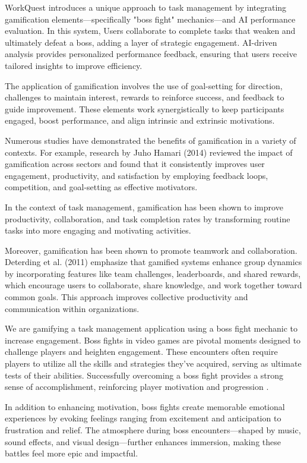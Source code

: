     WorkQuest introduces a unique approach to task management by integrating gamification elements—specifically "boss fight" mechanics—and AI performance evaluation. In this system, Users collaborate to complete tasks that weaken and ultimately defeat a boss, adding a layer of strategic engagement. AI-driven analysis provides personalized performance feedback, ensuring that users receive tailored insights to improve efficiency.

    The application of gamification involves the use of goal-setting for direction, challenges to maintain interest, rewards to reinforce success, and feedback to guide improvement. These elements work synergistically to keep participants engaged, boost performance, and align intrinsic and extrinsic motivations. \cite{Game:Reward}

    Numerous studies have demonstrated the benefits of gamification in a variety of contexts. For example, research by Juho Hamari (2014) reviewed the impact of gamification across sectors and found that it consistently improves user engagement, productivity, and satisfaction by employing feedback loops, competition, and goal-setting as effective motivators. \cite{6758978}

    In the context of task management, gamification has been shown to improve productivity, collaboration, and task completion rates by transforming routine tasks into more engaging and motivating activities.

    Moreover, gamification has been shown to promote teamwork and collaboration. Deterding et al. (2011) emphasize that gamified systems enhance group dynamics by incorporating features like team challenges, leaderboards, and shared rewards, which encourage users to collaborate, share knowledge, and work together toward common goals. This approach improves collective productivity and communication within organizations. \cite{gamification:designElement}

    We are gamifying a task management application using a boss fight mechanic to increase engagement. Boss fights in video games are pivotal moments designed to challenge players and heighten engagement. These encounters often require players to utilize all the skills and strategies they've acquired, serving as ultimate tests of their abilities. Successfully overcoming a boss fight provides a strong sense of accomplishment, reinforcing player motivation and progression \cite{toxigon:bossFight}.

    In addition to enhancing motivation, boss fights create memorable emotional experiences by evoking feelings ranging from excitement and anticipation to frustration and relief. The atmosphere during boss encounters—shaped by music, sound effects, and visual design—further enhances immersion, making these battles feel more epic and impactful. \cite{toxigon:bossFight}

